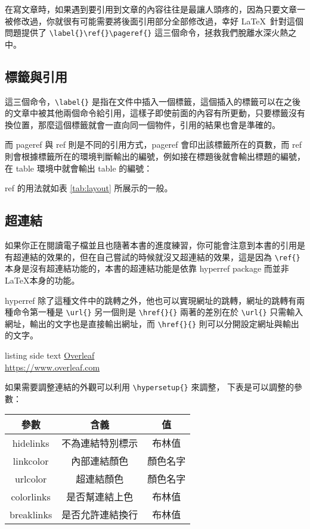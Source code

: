 在寫文章時，如果遇到要引用到文章的內容往往是最讓人頭疼的，因為只要文章一被修改過，你就很有可能需要將後面引用部分全部修改過，幸好 \LaTeX\ 針對這個問題提供了 \verb|\label{}\ref{}\pageref{}| 這三個命令，拯救我們脫離水深火熱之中。

\subsection{標籤與引用}

這三個命令，\verb`\label{}` 是指在文件中插入一個標籤，這個插入的標籤可以在之後的文章中被其他兩個命令給引用，這樣子即使前面的內容有所更動，只要標籤沒有換位置，那麼這個標籤就會一直向同一個物件，引用的結果也會是準確的。

而 pageref 與 ref 則是不同的引用方式，pageref 會印出該標籤所在的頁數，而 ref 則會根據標籤所在的環境判斷輸出的編號，例如接在標題後就會輸出標題的編號，在 table 環境中就會輸出 table 的編號：

\begin{tcblisting}{}
ref 的用法就如表 \ref{tab:layout} 所展示的一般。
\end{tcblisting}

\subsection{超連結}

如果你正在閱讀電子檔並且也隨著本書的進度練習，你可能會注意到本書的引用是有超連結的效果的，但在自己嘗試的時候就沒又超連結的效果，這是因為 \verb|\ref{}| 本身是沒有超連結功能的，本書的超連結功能是依靠 hyperref package 而並非 \LaTeX 本身的功能。

hyperref 除了這種文件中的跳轉之外，他也可以實現網址的跳轉，網址的跳轉有兩種命令第一種是 \verb|\url{}| 另一個則是 \verb|\href{}{}| 兩著的差別在於 \verb|\url{}| 只需輸入網址，輸出的文字也是直接輸出網址，而 \verb|\href{}{}| 則可以分開設定網址與輸出的文字。

\begin{tcblisting}{listing side text}
\href{https://www.overleaf.com}{Overleaf}\\
\url{https://www.overleaf.com}
\end{tcblisting}

如果需要調整連結的外觀可以利用 \verb|\hypersetup{}| 來調整， 下表是可以調整的參數：

\begin{tabular}{ccc}
\hline
參數 & 含義 & 值 \\\hline\hline
hidelinks & 不為連結特別標示 & 布林值 \\\hline
linkcolor & 內部連結顏色 & 顏色名字 \\\hline
urlcolor & 超連結顏色 & 顏色名字 \\\hline
colorlinks & 是否幫連結上色 & 布林值 \\\hline
breaklinks & 是否允許連結換行 & 布林值 \\\hline
\end{tabular}
